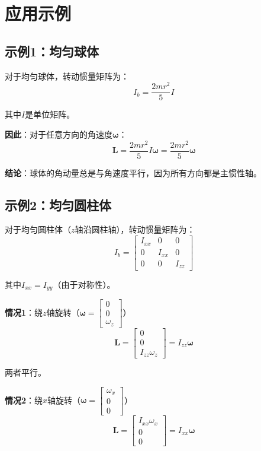 \documentclass[12pt,a4paper]{article}
\begin{document}
\section{应用示例}

\subsection{示例1：均匀球体}

对于均匀球体，转动惯量矩阵为：
\begin{equation}
I_b = \frac{2mr^2}{5} I
\end{equation}

其中$I$是单位矩阵。

\textbf{因此}：对于任意方向的角速度$\bm{\omega}$：
\begin{equation}
\bm{L} = \frac{2mr^2}{5} I \bm{\omega} = \frac{2mr^2}{5} \bm{\omega}
\end{equation}

\textbf{结论}：球体的角动量总是与角速度平行，因为所有方向都是主惯性轴。

\subsection{示例2：均匀圆柱体}

对于均匀圆柱体（$z$轴沿圆柱轴），转动惯量矩阵为：
\begin{equation}
I_b = \begin{bmatrix}
I_{xx} & 0 & 0 \\
0 & I_{xx} & 0 \\
0 & 0 & I_{zz}
\end{bmatrix}
\end{equation}

其中$I_{xx} = I_{yy}$（由于对称性）。

\textbf{情况1}：绕$z$轴旋转（$\bm{\omega} = \begin{bmatrix} 0 \\ 0 \\ \omega_z \end{bmatrix}$）
\begin{equation}
\bm{L} = \begin{bmatrix}
0 \\
0 \\
I_{zz} \omega_z
\end{bmatrix} = I_{zz} \bm{\omega}
\end{equation}

两者平行。

\textbf{情况2}：绕$x$轴旋转（$\bm{\omega} = \begin{bmatrix} \omega_x \\ 0 \\ 0 \end{bmatrix}$）
\begin{equation}
\bm{L} = \begin{bmatrix}
I_{xx} \omega_x \\
0 \\
0
\end{bmatrix} = I_{xx} \bm{\omega}
\end{equation}
\end{document}
